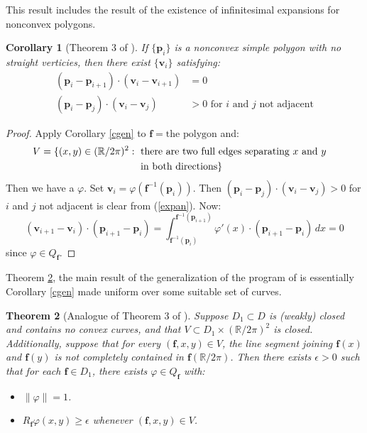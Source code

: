 \documentclass{amsart}
\newcommand{\R}			{\mathbb R}
\newcommand{\f}			{\mathbf f}
\newcommand{\p}			{\mathbf p}
\newcommand{\vv}		{\mathbf v}
\newcommand{\cross}		{\times}
\newtheorem{theorem}{Theorem}[section]
\newtheorem{corollary}[theorem]{Corollary}
\numberwithin{equation}{section}
\begin{document}
This result includes the result \cite{cdr} of the 
existence of infinitesimal expansions for nonconvex 
polygons.

\begin{corollary}[Theorem 3 of {\cite[p. 215]{cdr}}]
If $\{\p_i\}$ is a nonconvex simple polygon with no 
straight verticies, then there exist $\{\vv_i\}$ satisfying:
\begin{align}
(\p_i-\p_{i+1})\cdot(\vv_i-\vv_{i+1})&=0\\
(\p_i-\p_j)\cdot(\vv_i-\vv_j)&>0\text{ for $i$ and $j$ not adjacent}
\end{align}
\end{corollary}

\begin{proof}
Apply Corollary \ref{cgen} to $\f=\text{the polygon}$ and:
\begin{equation}
\begin{split}
V=\{(x,y)\in(\R/2\pi)^2:\text{ }&\text{there are two full edges 
separating $x$ and $y$}\cr&\text{in both directions}\}
\end{split}
\end{equation}
Then we have a $\varphi$.  Set $\vv_i=\varphi(\f^{-1}(\p_i))$.  
Then $(\p_i-\p_j)\cdot(\vv_i-\vv_j)>0$ for $i$ and $j$ not 
adjacent is clear from (\ref{expan}).  Now:
\begin{equation}
(\vv_{i+1}-\vv_i)\cdot(\p_{i+1}-\p_i)=
\int_{\f^{-1}(\p_i)}^{\f^{-1}(\p_{i+1})}\!\varphi'(x)\cdot(\p_{i+1}-\p_i)\,dx=0
\end{equation}
since $\varphi\in Q_\f$.
\end{proof}

Theorem \ref{gen}, the main result of the generalization of 
the program of \cite{cdr} is essentially Corollary \ref{cgen} 
made uniform over some suitable set of curves.

\begin{theorem}[Analogue of Theorem 3 of {\cite[p. 215]{cdr}}]\label{gen}
Suppose $D_1\subset D$ is (weakly) closed and contains no 
convex curves, and that $V\subset D_1\cross (\R/2\pi)^2$ 
is closed.  Additionally, suppose that for every $(\f,x,y)\in V$, 
the line segment joining $\f(x)$ and $\f(y)$ is not completely 
contained in $\f(\R/2\pi)$.  Then there exists $\epsilon>0$ such 
that for each $\f\in D_1$, there exists $\varphi\in Q_\f$ with:
\begin{itemize}
\item[(1)] $\|\varphi\|=1$.
\item[(2)] $R_\f\varphi(x,y)\geq\epsilon$ whenever $(\f,x,y)\in V$.
\end{itemize}
\end{theorem}
\end{document}
